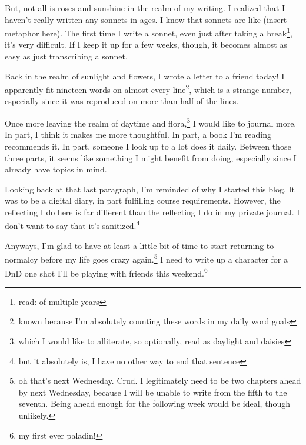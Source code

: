 \documentclass[12pt]{article}[titlepage]
\newcommand{\1}{\={a}}
\newcommand{\2}{\={e}}
\newcommand{\3}{\={\i}}
\newcommand{\4}{\=o}
\newcommand{\5}{\=u}
\newcommand{\6}{\={A}}
\renewcommand{\,}{\textsuperscript{,}}
\begin{document}
But, not all is roses and sunshine in the realm of my writing.
I realized that I haven't really written any sonnets in ages.
I know that sonnets are like (insert metaphor here).
The first time I write a sonnet, even just after taking a break\footnote{read: of multiple years}, it's very difficult.
If I keep it up for a few weeks, though, it becomes almost as easy as just transcribing a sonnet.

Back in the realm of sunlight and flowers, I wrote a letter to a friend today!
I apparently fit nineteen words on almost every line\footnote{known because I'm absolutely counting these words in my daily word goals}, which is a strange number, especially since it was reproduced on more than half of the lines.

Once more leaving the realm of daytime and flora,\footnote{which I would like to alliterate, so optionally, read as daylight and daisies} I would like to journal more.
In part, I think it makes me more thoughtful.
In part, a book I'm reading recommends it.
In part, someone I look up to a lot does it daily.
Between those three parts, it seems like something I might benefit from doing, especially since I already have topics in mind.

Looking back at that last paragraph, I'm reminded of why I started this blog.
It was to be a digital diary, in part fulfilling course requirements.
However, the reflecting I do here is far different than the reflecting I do in my private journal.
I don't want to say that it's sanitized.\footnote{but it absolutely is, I have no other way to end that sentence}

Anyways, I'm glad to have at least a little bit of time to start returning to normalcy before my life goes crazy again.\footnote{oh that's next Wednesday. Crud. I legitimately need to be two chapters ahead by next Wednesday, because I will be unable to write from the fifth to the seventh. Being ahead enough for the following week would be ideal, though unlikely.}
I need to write up a character for a DnD one shot I'll be playing with friends this weekend.\footnote{my first ever paladin!}
\end{document}
